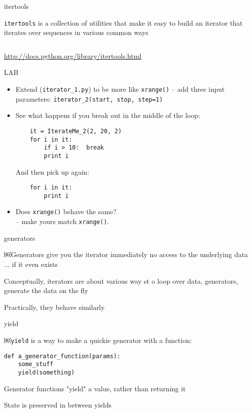 \documentclass{beamer}
\begin{document}
\begin{frame}[fragile]{itertools}

{\Large \verb|itertools| is a collection of utilities that make it easy to
build an iterator that iterates over sequences in various common ways}

\begin{verbatim}

\end{verbatim}

\url{http://docs.python.org/library/itertools.html}

\end{frame}
\begin{frame}[fragile]{LAB}

\begin{itemize}
  \item  Extend (\verb|iterator_1.py|) to be more like \verb|xrange()| --
         add three input parameters: \verb|iterator_2(start, stop, step=1)|
  \item  See what happens if you break out in the middle of the loop:
\begin{verbatim}
    it = IterateMe_2(2, 20, 2)
    for i in it:
        if i > 10:  break
        print i
\end{verbatim}
And then pick up again:
\begin{verbatim}
    for i in it:
        print i
\end{verbatim}
  \item  Does \verb|xrange()| behave the same?\\
          -- make yours match \verb|xrange()|.
\end{itemize}
\end{frame}

\begin{frame}[fragile]{generators}

\Large{￼Generators give you the iterator immediately
no access to the underlying data
... if it even exists}

\vfill
\Large{ Conceptually, iterators are about various way st o loop over data,
generators, generate the data on the fly}

\vfill
\Large{ Practically, they behave similarly}

\end{frame}

\begin{frame}[fragile]{yield}

\Large{￼\verb|yield| is a way to make a quickie generator with a function:}

\begin{verbatim}
def a_generator_function(params):
    some_stuff
    yield(something)
\end{verbatim}

\vfill
\Large{ Generator functions "yield" a value, rather than returning it }

\vfill
\Large{ State is preserved in between yields }

\end{frame}
\end{document}
